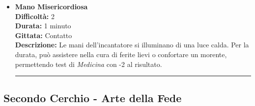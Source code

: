 \documentclass[../manuale_main.tex]{subfiles}
\begin{document}
\begin{itemize}
\vspace{0.5cm}\rule{\textwidth}{0.4pt}\vspace{1cm}

\item \textbf{Mano Misericordiosa} \\
\textbf{Difficoltà:} 2 \\
\textbf{Durata:} 1 minuto \\
\textbf{Gittata:} Contatto \\
\textbf{Descrizione:} Le mani dell’incantatore si illuminano di una luce calda. Per la durata, può assistere nella cura di ferite lievi o confortare un morente, permettendo test di \textit{Medicina} con -2 al risultato.


\vspace{0.5cm}\rule{\textwidth}{0.4pt}\vspace{1cm}

\end{itemize}


\clearpage
 \subsection*{Secondo Cerchio - Arte della Fede}
\end{document}
